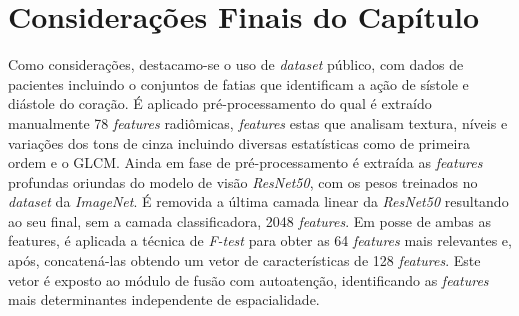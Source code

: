 \section{Considerações Finais do Capítulo}
\label{sec:cap4_consideracoes_finais}

Como considerações, destacamo-se o uso de \textit{dataset} público, com dados de pacientes incluindo o conjuntos de fatias que identificam a ação de sístole e diástole do coração. É aplicado pré-processamento do qual é extraído manualmente 78 \textit{features} radiômicas, \textit{features} estas que analisam textura, níveis e variações dos tons de cinza incluindo diversas estatísticas como de primeira ordem e o \gls{GLCM}. Ainda em fase de pré-processamento é extraída as \textit{features} profundas oriundas do modelo de visão \textit{ResNet50}, com os pesos treinados no \textit{dataset} da \textit{ImageNet}. É removida a última camada linear da \textit{ResNet50} resultando ao seu final, sem a camada classificadora, 2048 \textit{features}. Em posse de ambas as features, é aplicada a técnica de \textit{F-test} para obter as 64 \textit{features} mais relevantes e, após, concatená-las obtendo um vetor de características de 128 \textit{features}. Este vetor é exposto ao módulo de fusão com autoatenção, identificando as \textit{features} mais determinantes independente de espacialidade. 